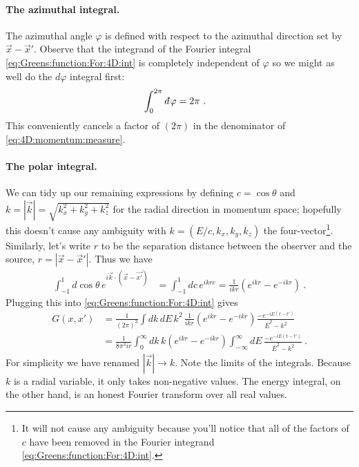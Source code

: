 \paragraph{The azimuthal integral.}
The azimuthal angle $\varphi$ is defined with respect to the azimuthal direction set by $\vec{x}-\vec{x}'$. Observe that the integrand of the Fourier integral \eqref{eq:Greens:function:For:4D:int} is completely independent of $\varphi$ so we might as well do the $d\varphi$ integral first:
\begin{align}
	\int_0^{2\pi} \dbar \varphi &= 2\pi \ .
\end{align}
This conveniently cancels a factor of $(2\pi)$ in the denominator of \eqref{eq:4D:momentum:measure}.

\paragraph{The polar integral.}
We can tidy up our remaining expressions by defining $c=\cos\theta$ and $k = |\vec{k}| = \sqrt{k_x^2 + k_y^2+k_z^2}$ for the radial direction in momentum space; hopefully this doesn't cause any ambiguity with $k = (E/c,k_x,k_y,k_z)$ the four-vector\footnote{It will not cause any ambiguity because you'll notice that all of the factors of $c$ have been removed in the Fourier integrand \eqref{eq:Greens:function:For:4D:int}.}. Similarly, let's write $r$ to be the separation distance between the observer and the source, $r=|\vec{x}-\vec{x}'|$. Thus we have
\begin{align}
	\int_{-1}^1 d\cos\theta \, e^{i\vec{k}\cdot(\vec{x}-\vec{x'})}
	&=
	\int_{-1}^1 dc\, e^{ikrc}
	= 
	\frac{1}{ikr}\left(e^{ikr} - e^{-ikr}\right) \ .
\end{align}
Plugging this into \eqref{eq:Greens:function:For:4D:int} gives
\begin{align}
	G(x,x') &=
	\frac{1}{(2\pi)^3}
	\int dk \, dE \, k^2
	\, 
	\frac{1}{ikr}\left(e^{ikr} - e^{-ikr}\right)
	\frac{- e^{-iE (t-t')}}{\bar{E}^2-k^2}
	\\
	&=
	\frac{1}{8\pi^3 ir}
	\int_0^\infty dk\, 
	k \left(e^{ikr} - e^{-ikr}\right)
	\int_{-\infty}^\infty dE \, 
	\frac{-e^{-iE (t-t')}}{\bar{E}^2-k^2}
	\ .
\end{align}
For simplicity we have renamed $|\vec k| \to k$. Note the limits of the integrals. Because $k$ is a radial variable, it only takes non-negative values. The energy integral, on the other hand, is an honest Fourier transform over all real values.

